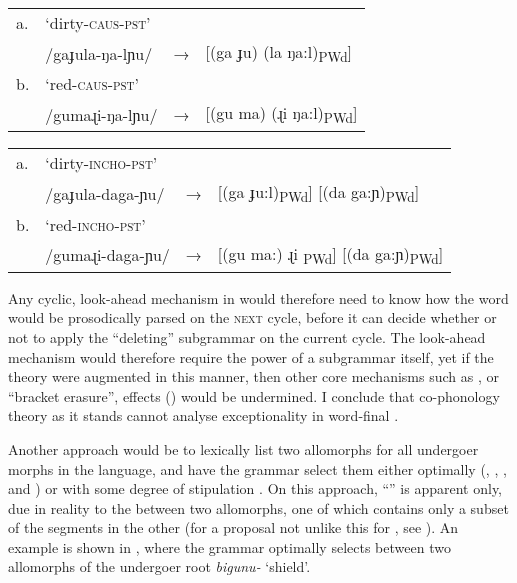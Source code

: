 \documentclass[output=paper,
modfonts
]{LSP/langsci}
\begin{document}
\ea \label{ex:round:24} 
\begin{tabular}[t]{@{}llll}
a. &`dirty\textsc{-caus-pst'} &&\\
& /gaɟula-ŋa-lɲu/ & → & [(ga ɟu) (la ŋa:l)\textsubscript{PWd}] \\
b.& `red\textsc{{}-caus-pst'}&&\\
& /gumaɻi-ŋa-lɲu/ & → & [(gu ma) (ɻi ŋa:l)\textsubscript{PWd}] \\
\end{tabular}

\ex \label{ex:round:25}
\begin{tabular}[t]{@{}llll}
a. &`dirty\textsc{-incho-pst}' &&\\
& /gaɟula-daga-ɲu/ & → & [(ga ɟu:l)\textsubscript{PWd}] [(da ga:ɲ)\textsubscript{PWd}] \\
b. &`red\textsc{-incho-pst}' &&\\
& /gumaɻi-daga-ɲu/ & → & [(gu ma:) ɻi\textsubscript{ PWd}] [(da ga:ɲ)\textsubscript{PWd}] 
\end{tabular}
\z

Any cyclic, look-ahead mechanism in  would therefore need to know how the word would be prosodically parsed on the \textsc{next} cycle, before it can decide whether or not to apply the ``deleting'' subgrammar on the current cycle. The look-ahead mechanism would therefore require the power of a subgrammar itself, yet if the theory were augmented in this manner, then other core mechanisms such as , or ``bracket erasure'', effects (\citealt{inkelas2007}) would be undermined. I conclude that co-phonology theory as it stands cannot analyse exceptionality in  word-final .

Another approach would be to lexically list two allomorphs for all undergoer morphs in the language, and have the grammar select them either optimally (\citealt{mester1994}, \citealt{kager1996}, \citealt{mascaro1996}, and \citealt{tranel1996a,tranel1996b}) or with some degree of stipulation \citep{bonet2007,round2013,wolf2015}. On this approach, ``'' is apparent only, due in reality to the  between two  allomorphs, one of which contains only a subset of the segments in the other (for a proposal not unlike this for , see \citealt{hayes1997}). An example is shown in , where the grammar optimally selects between two  allomorphs of the undergoer root\textit{ bigunu-} `shield'.
\end{document}
